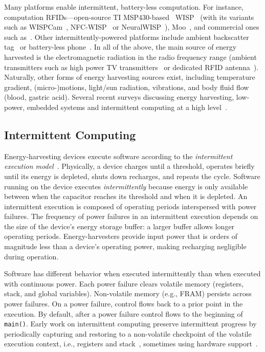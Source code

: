 Many platforms enable intermittent, battery-less computation. For instance, computation RFIDs---open-source TI MSP430-based~\cite{wolverine} WISP~\cite{wisp5} (with its variants such as WISPCam~\cite{naderiparizi_rfid_2015}, NFC-WISP~\cite{zhao_rfid_2015} or NeuralWISP~\cite{holleman_biocas_2008}), Moo~\cite{moo}, and commercial ones such as~\cite{medusa_farsens_2017}. Other intermittently-powered platforms include ambient backscatter tag~\cite{liu_sigcomm_2013,parks_sigcomm_2014} or battery-less phone~\cite{talla_imwut_2017}. In all of the above, the main source of energy harvested is the electromagnetic radiation in the radio frequency range (ambient transmitters such as high power TV transmitters~\cite{liu_sigcomm_2013} or dedicated RFID antenna~\cite{wisp5,moo,talla_imwut_2017,medusa_farsens_2017,holleman_biocas_2008,naderiparizi_rfid_2015}). Naturally, other forms of energy harvesting sources exist, including temperature gradient, (micro-)motions, light/sun radiation, vibrations, and body fluid flow (blood, gastric acid). Several recent surveys discussing energy harvesting, low-power, embedded systems and intermittent computing at a high level~\cite{paradiso_pvc_2005,soyata_csm_2016,prasad_comst_2014,ku_cst_2016,lucia_snapl_2017}.

\subsection{Intermittent Computing}
\label{sec:background_consistency}

Energy-harvesting devices execute software according to the {\em intermittent execution model}~\cite{dino,chain,alpaca,ratchet}. Physically, a device charges until a threshold, operates briefly until its energy is depleted, shuts down recharges, and repeats the cycle. Software running on the device executes {\em intermittently} because energy is only available between when the capacitor reaches its threshold and when it is depleted. An intermittent execution is composed of operating periods interspersed with power failures. The frequency of power failures in an intermittent execution depends on the size of the device's energy storage buffer: a larger buffer allows longer operating periods. Energy-harvesters provide input power that is orders of magnitude less than a device's operating power, making recharging negligible during operation.

Software has different behavior when executed intermittently than when executed with continuous power. Each power failure clears volatile memory (registers, stack, and global variables). Non-volatile memory (e.g., FRAM) persists across power failures. On a power failure, control flows back to a prior point in the execution. By default, after a power failure control flows to the beginning of {\tt main()}. Early work on intermittent computing preserve intermittent progress by periodically capturing and restoring to a non-volatile checkpoint of the volatile execution context, i.e., registers and stack~\cite{mementos,quickrecall}, sometimes using hardware support~\cite{mementos,mottola2017harvos,hibernusplusplus,hibernus,idetic}. 

